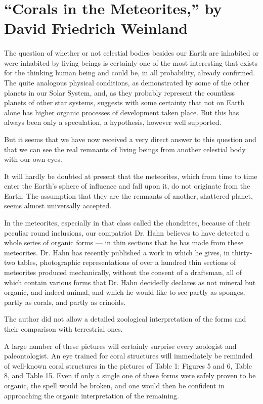 \documentclass[a4paper, 12pt, oneside]{article}
\begin{document}
\section{``Corals in the Meteorites,'' by David Friedrich Weinland}
\paragraph*{}
The question of whether or not celestial bodies besides our Earth are inhabited or were inhabited by living beings is certainly one of the most interesting that exists for the thinking human being and could be, in all probability, already confirmed. The quite analogous physical conditions, as demonstrated by some of the other planets in our Solar System, and, as they probably represent the countless planets of other star systems, suggests with some certainty that not on Earth alone has higher organic processes of development taken place. But this has always been only a speculation, a hypothesis, however well supported.

But it seems that we have now received a very direct answer to this question and that we can see the real remnants of living beings from another celestial body with our own eyes.

It will hardly be doubted at present that the meteorites, which from time to time enter the Earth's sphere of influence and fall upon it, do not originate from the Earth. The assumption that they are the remnants of another, shattered planet, seems almost universally accepted.

In the meteorites, especially in that class called the chondrites, because of their peculiar round inclusions, our compatriot Dr. Hahn believes to have detected a whole series of organic forms --- in thin sections that he has made from these meteorites. Dr. Hahn has recently published a work in which he gives, in thirty-two tables, photographic representations of over a hundred thin sections of meteorites produced mechanically, without the consent of a draftsman, all of which contain various forms that Dr. Hahn decidedly declares as not mineral but organic, and indeed animal, and which he would like to see partly as sponges, partly as corals, and partly as crinoids.

The author did not allow a detailed zoological interpretation of the forms and their comparison with terrestrial ones.

A large number of these pictures will certainly surprise every zoologist and paleontologist. An eye trained for coral structures will immediately be reminded of well-known coral structures in the pictures of Table 1: Figures 5 and 6, Table 8, and Table 15. Even if only a single one of these forms were safely proven to be organic, the spell would be broken, and one would then be confident in approaching the organic interpretation of the remaining.
\end{document}
